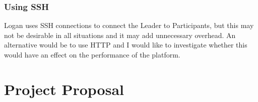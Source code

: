 \documentclass[12pt,a4paper,twoside,openright]{report}
\begin{document}
	\subsection{Using SSH}
	Logan uses SSH connections to connect the Leader to Participants, but this may not be desirable in all situations and it may add unnecessary overhead. 
	An alternative would be to use HTTP and I would like to investigate whether this would have an effect on the performance of the platform.

	
	
	
	\appendix

	\chapter{Project Proposal}
	
	
	
	
\end{document}
